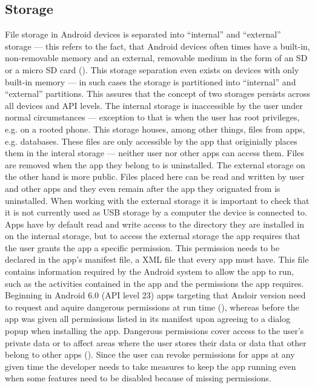 \subsection{Storage}
\label{storage}
File storage in Android devices is separated into ``internal'' and ``external'' storage --- this refers to the fact, that Android devices often times have a built-in, non-removable memory and an external, removable medium in the form of an SD or a micro SD card (\cite{android_storage}). This storage separation even exists on devices with only built-in memory --- in such cases the storage is partitioned into ``internal'' and ``external'' partitions. This assures that the concept of two storages persists across all devices and \gls{API} levels. The internal storage is inaccessible by the user under normal circumstances --- exception to that is when the user has root privileges, e.g. on a rooted phone. This storage houses, among other things, files from apps, e.g. databases. These files are only accessible by the app that originially places them in the interal storage --- neither user nor other apps can access them. Files are removed when the app they belong to is uninstalled. 
The external storage on the other hand is more public. Files placed here can be read and written by user and other apps and they even remain after the app they orignated from is uninstalled. When working with the external storage it is important to check that it is not currently used as \gls{USB} storage by a computer the device is connected to.
Apps have by default read and write access to the directory they are installed in on the internal storage, but to access the external storage the app requires that the user grants the app a specific permission. This permission needs to be declared in the app's manifest file, a XML file that every app must have. This file contains information required by the Android system to allow the app to run, such as the activities contained in the app and the permissions the app requires. Beginning in Android 6.0 (\gls{API} level 23) apps targeting that Andoir version need to request and aquire dangerous permissions at run time (\cite{android_permissions}), whereas before the app was given all permissions listed in its manifest upon agreeing to a dialog popup when installing the app. Dangerous permissions cover access to the user's private data or to affect areas where the user stores their data or data that other belong to other apps (\cite{android_permissions}). Since the user can revoke permissions for apps at any given time the developer needs to take measures to keep the app running even when some features need to be disabled because of missing permissions.  
